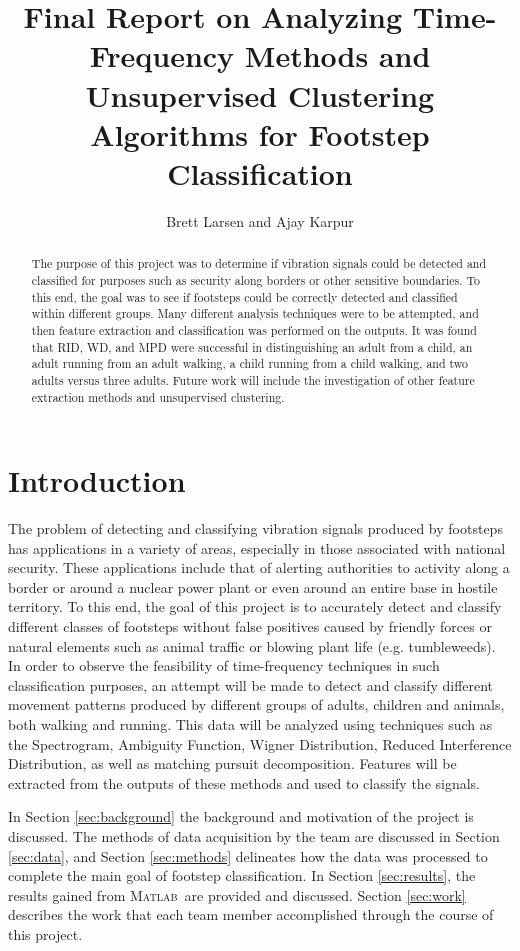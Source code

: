 \documentclass{article}[11pt]
\title{Final Report on Analyzing Time-Frequency Methods and Unsupervised Clustering Algorithms for Footstep Classification}
\author{Brett Larsen and Ajay Karpur}
\date{}
\newcommand{\Matlab}{\textsc{Matlab}}
\begin{document}
\maketitle
\doublespace


\begin{abstract}
The purpose of this project was to determine if vibration signals could be detected and classified for purposes such as security along borders or other sensitive boundaries. To this end, the goal was to see if footsteps could be correctly detected and classified within different groups. Many different analysis techniques were to be attempted, and then feature extraction and classification was performed on the outputs. It was found that RID, WD, and MPD were successful in distinguishing an adult from a child, an adult running from an adult walking, a child running from a child walking, and two adults versus three adults.  Future work will include the investigation of other feature extraction methods and unsupervised clustering.
\end{abstract}

\section{Introduction}
\label{sec:intro}
The problem of detecting and classifying vibration signals produced by footsteps has applications in a variety of areas, especially in those associated with national security. These applications include that of alerting authorities to activity along a  border or around a nuclear power plant or even around an entire base in hostile territory. To this end, the goal of this project is to accurately detect and classify different classes of footsteps without false positives caused by friendly forces or natural elements such as animal traffic or blowing plant life (e.g. tumbleweeds). In order to observe the feasibility of time-frequency techniques in such classification purposes, an attempt will be made to detect and classify different movement patterns produced by different groups of adults, children and animals, both walking and running. This data will be analyzed using techniques such as the Spectrogram, Ambiguity Function, Wigner Distribution, Reduced Interference Distribution, as well as matching pursuit decomposition. Features will be extracted from the outputs of these methods and used to classify the signals.

In Section \ref{sec:background} the background and motivation of the project is discussed. The methods of data acquisition by the team are discussed in Section \ref{sec:data}, and Section \ref{sec:methods} delineates how the data was processed to complete the main goal of footstep classification.  In Section \ref{sec:results}, the results gained from \Matlab \ are provided and discussed. Section \ref{sec:work} describes the work that each team member accomplished through the course of this project.
\end{document}
